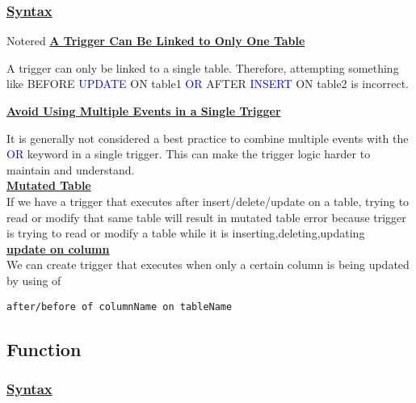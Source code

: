 \subsubsection*{\underline{Syntax}}






\begin{prettyBox}{Note}{red}
\textbf{\underline{A Trigger Can Be Linked to Only One Table}}

\vspace{0.15cm}
A trigger can only be linked to a single table. Therefore, attempting something like 
BEFORE \textcolor{blue}{UPDATE} ON table1 \textcolor{blue}{OR} AFTER \textcolor{blue}{INSERT} ON table2 is incorrect.

\vspace{0.25cm}

\textbf{\underline{Avoid Using Multiple Events in a Single Trigger}}

\vspace{0.15cm}
It is generally not considered a best practice to combine multiple events with the \textcolor{blue}{OR} keyword in a single trigger. This can make the trigger logic harder to maintain and understand.\\[0.15cm]
\textbf{\underline{Mutated Table}}\\[0.15cm]
If we have a trigger that executes after insert/delete/update on a table, trying to read or modify that same table will result in mutated table error because trigger is trying to read or modify a table while it is inserting,deleting,updating\\[0.25cm]
\textbf{\underline{update on column}}\\[0.15cm]
We can create trigger that executes when only a certain column is being updated by using of
\begin{lstlisting}
after/before of columnName on tableName
\end{lstlisting}
\end{prettyBox}

\newpage
\subsection{Function}


\subsubsection*{\underline{Syntax}}

